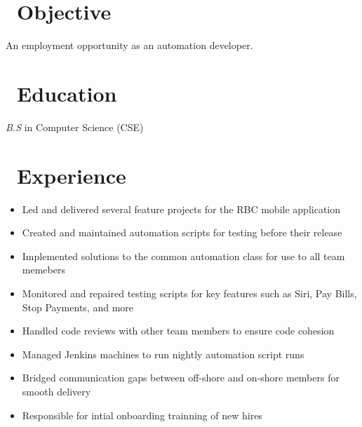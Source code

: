 \documentclass{resume}
\begin{document}



\section{\faSearch\ Objective}
An employment opportunity as an automation developer.

\section{\faGraduationCap\ Education}
\textit{B.S} in Computer Science (CSE)

\section{\faUsers\ Experience}
\role{QA Analyst}

\begin{itemize}
  \item Led and delivered several feature projects for the RBC mobile application
  \item Created and maintained automation scripts for testing before their release
  \item Implemented solutions to the common automation class for use to all team memebers
  \item Monitored and repaired testing scripts for key features such as Siri, Pay Bills, Stop Payments, and more
  \item Handled code reviews with other team members to ensure code cohesion
  \item Managed Jenkins machines to run nightly automation script runs
  \item Bridged communication gaps between off-shore and on-shore members for smooth delivery
  \item Responsible for intial onboarding trainning of new hires
\end{itemize}

\end{document}
